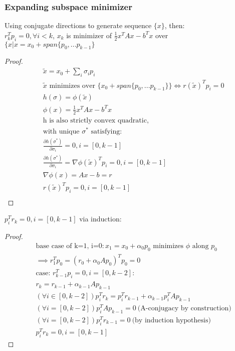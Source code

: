 \documentclass[8pt,letter]{article}
\begin{document}
\begin{multicols*}{2}
  \vfill\null
  \columnbreak
  
  \subsubsection{Expanding subspace minimizer}
  Using conjugate directions to generate sequence $\{x\}$, then:\\
  $r_k^T p_i = 0, \forall i < k$, $x_k$ is minimizer of $\frac{1}{2} x^TAx - b^Tx$ over $\{ x | x= x_0 + span\{p_0,...p_{k-1}\}$
  \begin{proof}
    \begin{align*}
      &\tilde{x} = x_0 + \sum_i \sigma_i p_i\\
      &\tilde{x} \text{ minimizes over }\{x_0 + span\{ p_0, ... p_{k-1}\}\} \iff r(\tilde{x})^Tp_i = 0\\
      &h(\sigma) = \phi(\tilde{x})\\
      &\phi(x) =\frac{1}{2}x^TAx-b^Tx\\
      &\text{h is also strictly convex quadratic,}\\
      &\text{with unique }\sigma^*\text{ satisfying:}\\
      &\frac{\partial h(\sigma^*)}{\partial \sigma_i} = 0, i=[0,k-1]\\
      &\frac{\partial h(\sigma^*)}{\partial \sigma_i} = \nabla \phi(\tilde{x})^T p_i = 0, i = [0,k-1]\\
      &\nabla \phi(x) = Ax-b=r\\
      &r(\tilde{x})^T p_i = 0, i=[0,k-1]\\
    \end{align*}  
  \end{proof}
  $p_i^T r_k=0, i=[0,k-1]$ via induction:
  \begin{proof}
    \begin{align*}
      &\text{base case of k=1, i=0}: x_1 = x_0 + \alpha_0 p_0 \text{ minimizes } \phi \text{ along } p_0\\
      &\implies r_1^T p_0 = (r_0 + \alpha_0  A p_0)^T p_0= 0 \\
      &\text{case: }r_{k-1}^T p_i = 0, i=[0,k-2]:\\
      &r_k = r_{k-1} + \alpha_{k-1} A p_{k-1}\\
      &(\forall i\in[0,k-2]) p_i^T r_k = p_i^T r_{k-1} + \alpha_{k-1} p_i^T A p_{k-1}\\
      &(\forall i=[0,k-2]) p_i^T A p_{k-1}=0\ \text{(A-conjugacy by construction)}\\
      &(\forall i=[0,k-2]) p_i^T r_{k-1} = 0\ \text{(by induction hypothesis)}\\
      &p_i^T r_k = 0, i=[0,k-1]
    \end{align*}
  \end{proof}


\end{multicols*}
\end{document}
